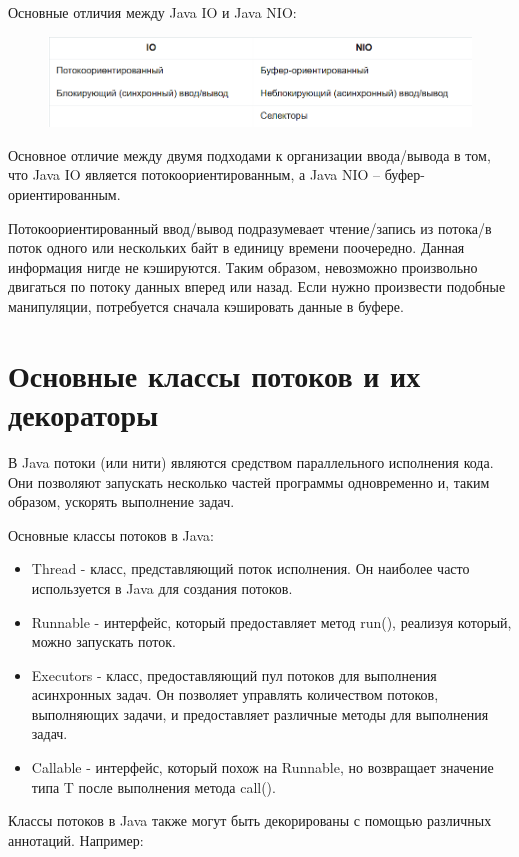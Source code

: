 Основные отличия между Java IO и Java NIO:

\begin{figure}[h]
\centering
\includegraphics[width=0.8\linewidth]{images/pic/pic20-1.png}
\label{fig:mpr}
\end{figure}

Основное отличие между двумя подходами к организации ввода/вывода в том, что Java IO является потокоориентированным, а Java NIO – буфер-ориентированным.

Потокоориентированный ввод/вывод подразумевает чтение/запись из потока/в поток одного или нескольких байт в единицу времени поочередно. Данная информация нигде не кэшируются. Таким образом, невозможно произвольно двигаться по потоку данных вперед или назад. Если нужно произвести подобные манипуляции, потребуется сначала кэшировать данные в буфере.

\section{Основные классы потоков и их декораторы}

В Java потоки (или нити) являются средством параллельного исполнения кода. Они позволяют запускать несколько частей программы одновременно и, таким образом, ускорять выполнение задач.

Основные классы потоков в Java:

\begin{itemize}
\item Thread - класс, представляющий поток исполнения. Он наиболее часто используется в Java для создания потоков.
\item Runnable - интерфейс, который предоставляет метод run(), реализуя который, можно запускать поток.
\item Executors - класс, предоставляющий пул потоков для выполнения асинхронных задач. Он позволяет управлять количеством потоков, выполняющих задачи, и предоставляет различные методы для выполнения задач.
\item Callable - интерфейс, который похож на Runnable, но возвращает значение типа T после выполнения метода call().
\end{itemize}

Классы потоков в Java также могут быть декорированы с помощью различных аннотаций. Например:

